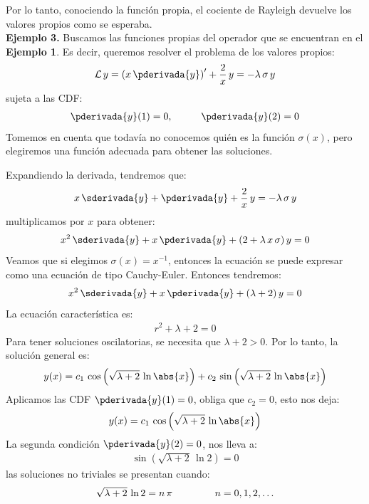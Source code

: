 Por lo tanto, conociendo la función propia, el cociente de Rayleigh devuelve los valores propios como se esperaba.
\\[0.5em]
\textbf{Ejemplo 3. } Buscamos las funciones propias del operador que se encuentran en el \textbf{Ejemplo 1}. Es decir, queremos resolver el problema de los valores propios:
\begin{align}
\mathcal{L} \, y = \left( x \, \pderivada{y} \right)^{\prime} + \dfrac{2}{x} \, y = - \lambda \, \sigma \, y
\label{eq:ecuacion_04_14}
\end{align}
sujeta a las CDF:
\begin{align*}
\pderivada{y} (1) = 0, \hspace{1cm} \pderivada{y}(2) = 0
\end{align*}
Tomemos en cuenta que todavía no conocemos quién es la función $\sigma (x)$, pero elegiremos una función adecuada para obtener las soluciones.
\par
\noindent
Expandiendo la derivada, tendremos que:
\begin{align*}
x \, \sderivada{y} + \pderivada{y} + \dfrac{2}{x} \, y = - \lambda \, \sigma \, y
\end{align*}
multiplicamos por $x$ para obtener:
\begin{align*}
x^{2} \, \sderivada{y} + x \, \pderivada{y} + (2 + \lambda \, x \,  \sigma) \, y = 0
\end{align*}
Veamos que si elegimos $\sigma(x) = x^{-1}$, entonces la ecuación se puede expresar como una ecuación de tipo Cauchy-Euler. Entonces tendremos:
\begin{align*}
x^{2} \, \sderivada{y} + x \, \pderivada{y} + (\lambda + 2) \, y = 0
\end{align*}
La ecuación característica es:
\begin{align*}
r^{2} + \lambda + 2 = 0
\end{align*}
Para tener soluciones oscilatorias, se necesita que $\lambda + 2 > 0$. Por lo tanto, la solución general es:
\begin{align}
y(x) = c_{1} \, \cos \left( \sqrt{\lambda + 2} \, \ln \abs{x} \right) + c_{2} \, \sin \left( \sqrt{\lambda + 2} \, \ln \abs{x} \right)
\label{eq:ecuacion_04_15}
\end{align}
Aplicamos las CDF $\pderivada{y}(1) = 0$, obliga que $c_{2} = 0$, esto nos deja:
\begin{align*}
y(x) = c_{1} \, \cos \left( \sqrt{\lambda + 2} \, \ln \abs{x} \right)
\end{align*}
La segunda condición $\pderivada{y}(2) = 0$, nos lleva a:
\begin{align*}
\sin \left( \sqrt{\lambda + 2} \, \ln 2 \right) = 0
\end{align*}
las soluciones no triviales se presentan cuando:
\begin{align*}
\sqrt{\lambda + 2} \, \ln 2 = n \, \pi \hspace{1.5cm} n = 0, 1, 2, \ldots
\end{align*}

